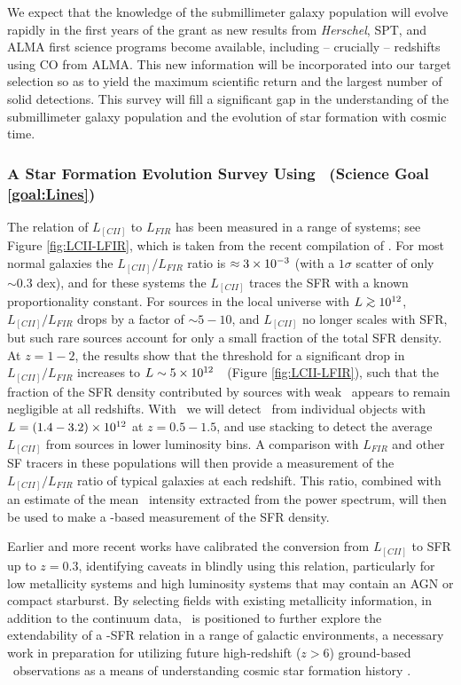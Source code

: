 We expect that the knowledge of the submillimeter galaxy population
will evolve rapidly in the first years of the grant as new results
from {\em Herschel}, SPT, and ALMA first science programs become
available, including -- crucially -- redshifts using CO from ALMA.
This new information will be incorporated into our target selection so
as to yield the maximum scientific return and the largest number of
solid detections.  This survey will fill a significant gap in the
understanding of the submillimeter galaxy population and the evolution
of star formation with cosmic time.

\subsubsection{A Star Formation Evolution Survey Using \cii\ 
(Science Goal \ref{goal:Lines})}

The relation of $L_{[CII]}$ to $L_{FIR}$ has been measured in a range
of systems; see Figure \ref{fig:LCII-LFIR}, which is taken from the
recent compilation of \Citet{gracia-carpio11}.  For most normal
galaxies the $L_{[CII]}/L_{FIR}$ ratio is $\approx 3\times10^{-3}$ (with a
$1\sigma$ scatter of only $\sim 0.3$ dex), and for these systems the
$L_{[CII]}$ traces the SFR with a known proportionality constant. For
sources in the local universe with $L \gsim 10^{12}$,
$L_{[CII]}/L_{FIR}$ drops by a factor of $\sim 5-10$, and $L_{[CII]}$
no longer scales with SFR, but such rare sources account for only a
small fraction of the total SFR density. At $z=1-2$, the
 results show that the threshold for a significant
drop in $L_{[CII]}/L_{FIR}$ increases to $L \sim 5\times10^{12}$~\Lsun\ (Figure
\ref{fig:LCII-LFIR}), such that the fraction of the SFR density
contributed by sources with weak \cii\ appears to remain negligible at
all redshifts. With \name\ we will detect \cii\ from individual
objects with $L = (1.4-3.2)\times10^{12}$ at $z=0.5-1.5$, and use stacking to detect
the average $L_{[CII]}$ from sources in lower luminosity bins. A
comparison with $L_{FIR}$ and other SF tracers in these populations
will then provide a measurement of the $L_{[CII]}/L_{FIR}$ ratio of
typical galaxies at each redshift. This ratio, combined with an
estimate of the mean \cii\ intensity extracted from the power
spectrum, will then be used to make a \cii-based measurement of the
SFR density.

Earlier \citep{boselli02,delooze11} and more recent \citep{sargsyan12} works have calibrated the conversion from $L_{[CII]}$ to SFR up to $z=0.3$, identifying caveats in blindly using this relation, particularly for low metallicity systems and high luminosity systems that may contain an AGN or compact starburst. By selecting fields with existing metallicity information, in addition to the continuum data, \name\ is positioned to further explore the extendability of a \cii-SFR relation in a range of galactic environments, a necessary work in preparation for utilizing future high-redshift ($z>6$) ground-based \cii\ observations as a means of understanding cosmic star formation history .

